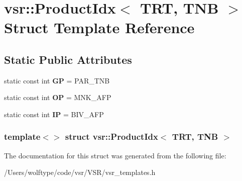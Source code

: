 \hypertarget{structvsr_1_1_product_idx_3_01_t_r_t_00_01_t_n_b_01_4}{\section{vsr\-:\-:Product\-Idx$<$ T\-R\-T, T\-N\-B $>$ Struct Template Reference}
\label{structvsr_1_1_product_idx_3_01_t_r_t_00_01_t_n_b_01_4}
}
\subsection*{Static Public Attributes}
\begin{DoxyCompactItemize}
\item 
\hypertarget{structvsr_1_1_product_idx_3_01_t_r_t_00_01_t_n_b_01_4_abda9b337fdf862c8a7823a961daecaae}{static const int {\bfseries G\-P} = P\-A\-R\-\_\-\-T\-N\-B}\label{structvsr_1_1_product_idx_3_01_t_r_t_00_01_t_n_b_01_4_abda9b337fdf862c8a7823a961daecaae}

\item 
\hypertarget{structvsr_1_1_product_idx_3_01_t_r_t_00_01_t_n_b_01_4_adf44b26ead7708d141b11333f50322dc}{static const int {\bfseries O\-P} = M\-N\-K\-\_\-\-A\-F\-P}\label{structvsr_1_1_product_idx_3_01_t_r_t_00_01_t_n_b_01_4_adf44b26ead7708d141b11333f50322dc}

\item 
\hypertarget{structvsr_1_1_product_idx_3_01_t_r_t_00_01_t_n_b_01_4_a313d4e97f08ce6c2daacfe92ef9604e6}{static const int {\bfseries I\-P} = B\-I\-V\-\_\-\-A\-F\-P}\label{structvsr_1_1_product_idx_3_01_t_r_t_00_01_t_n_b_01_4_a313d4e97f08ce6c2daacfe92ef9604e6}

\end{DoxyCompactItemize}
\subsubsection*{template$<$$>$ struct vsr\-::\-Product\-Idx$<$ T\-R\-T, T\-N\-B $>$}



The documentation for this struct was generated from the following file\-:\begin{DoxyCompactItemize}
\item 
/\-Users/wolftype/code/vsr/\-V\-S\-R/vsr\-\_\-templates.\-h\end{DoxyCompactItemize}
